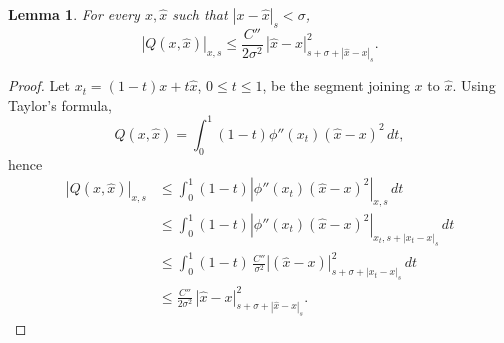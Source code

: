 \documentclass[oneside, 11pt]{amsbook}
\newcommand{\abs}[1]{{\left|#1\right|}}
\newcommand{\0}{{(0)}}
\newcommand{\3}{{(3)}}
\newtheorem{lemma}{Lemma}
\numberwithin{equation}{section}
\numberwithin{defn}{section}
\numberwithin{prop}{section}
\numberwithin{cor}{section}
\numberwithin{lemma}{section}
\numberwithin{rmk}{section}
\numberwithin{corollary}{section}
\begin{document}
\begin{lemma} 
\label{lemma Q}
For every $x,\hat{x}$ such that $\abs{x-\hat{x}}_s < \sigma$, 
\begin{equation}
\abs{Q(x,\hat{x})}_{x,s}\leq \frac{C''}{2\sigma^2}\,\abs{\hat{x} - x}^2_{{s+\sigma+\abs{\hat{x} - x}}_s}.
\label{stima Q}
\end{equation}
\end{lemma}

\begin{proof}
Let $x_t = (1-t)x + t\hat{x}$, $0\leq t\leq 1$, be the segment joining $x$ to $\hat{x}$. Using Taylor's formula,  \[Q(x,\hat{x})= \int_0^1 (1-t)\phi''(x_t)(\hat{x}-x)^2\, dt,\] hence
\begin{align*}
\abs{Q(x,\hat{x})}_{x,s}&\leq \int_0^1 (1-t)\abs{\phi''(x_t)(\hat{x}-x)^2}_{x,s}\, dt \\
&\leq \int_0^1 (1-t)\abs{\phi''(x_t)(\hat{x}-x)^2}_{x_t,s + \abs{x_t - x}_{s}}\,dt\\
&\leq \int_0^1 (1-t)\,\frac{C''}{\sigma^2} \abs{(\hat{x}-x)}^2_{s +\sigma + \abs{x_t - x}_{s}}\,dt\\
&\leq \frac{C''}{2\sigma^2}\,\abs{\hat{x} - x}^2_{{s+\sigma+\abs{\hat{x} - x}}_s}.
\end{align*}

\end{proof}
\end{document}
